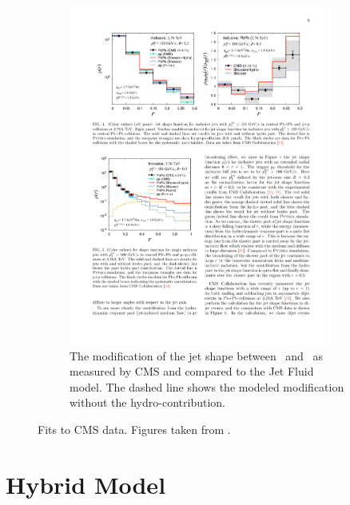 \begin{figure}
\begin{subfigure}{.45\textwidth}
\includegraphics[width=0.95\textwidth]{figures/jetMeasurements/JF_jetShapeModification}
\caption{The modification of the jet shape between \pp\ and \pbpb\ as measured by CMS \cite{Chatrchyan:2013kwa} and compared to the Jet Fluid model. The dashed line shows the modeled modification without the hydro-contribution.}
\label{fig:jf_jetshapemod}
\end{subfigure}
\caption{Fits to CMS data. Figures taken from \cite{Tachibana:2017syd}.}
\label{fig:JF_jetShapemodel}
\end{figure}





\section{Hybrid Model}













